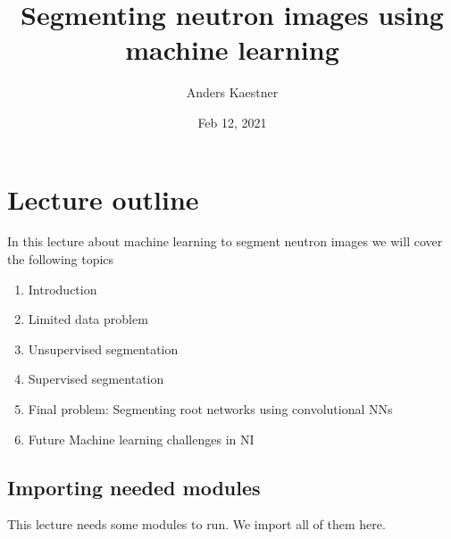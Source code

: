 \documentclass[letterpaper,10pt,english]{sphinxmanual}
\title{Segmenting neutron images using machine learning}
\date{Feb 12, 2021}
\author{Anders Kaestner}
\begin{document}
\pagestyle{empty}
\sphinxmaketitle
\pagestyle{plain}
\sphinxtableofcontents
\pagestyle{normal}
\label{\detokenize{ML4NeutronImageSegmentation::doc}}





\chapter{Lecture outline}
\label{\detokenize{ML4NeutronImageSegmentation:lecture-outline}}
In this lecture about machine learning to segment neutron images we will cover the following topics
\begin{enumerate}
%
\item {} 
Introduction

\item {} 
Limited data problem

\item {} 
Unsupervised segmentation

\item {} 
Supervised segmentation

\item {} 
Final problem: Segmenting root networks using convolutional NNs

\item {} 
Future Machine learning challenges in NI

\end{enumerate}


\section{Importing needed modules}
\label{\detokenize{ML4NeutronImageSegmentation:importing-needed-modules}}
This lecture needs some modules to run. We import all of them here.
\end{document}
